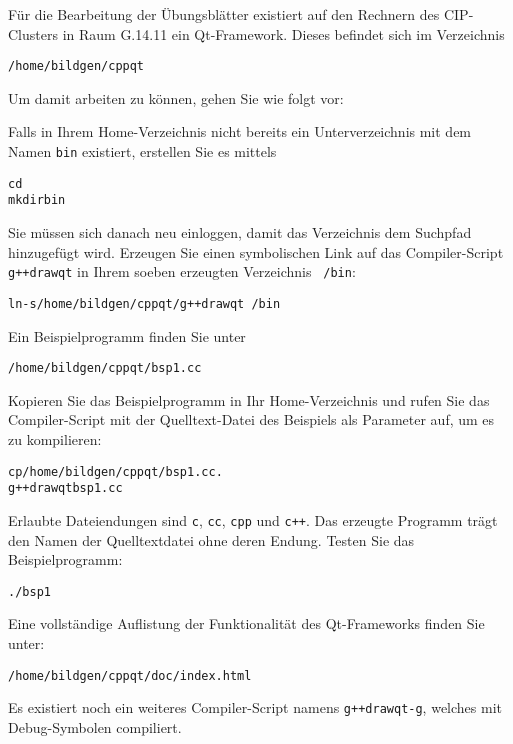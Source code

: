 %
Für die Bearbeitung der Übungsblätter existiert auf den Rechnern des
CIP-Clusters in Raum G.14.11 ein Qt-Framework. Dieses befindet sich im 
Verzeichnis
%
\vspace{-.5em}%
\begin{alltt}
   /home/bildgen/cppqt
\end{alltt}
\vspace{-.5em}%
Um damit arbeiten zu können, gehen Sie wie folgt vor:
%
\begin{bivsubt}
	\bivitem Falls in Ihrem Home-Verzeichnis nicht bereits ein
		Unterverzeichnis mit dem Namen \texttt{bin} existiert, erstellen
		Sie es mittels
		\begin{alltt}
		   cd ~
		   mkdir bin 
		\end{alltt}
		Sie müssen sich danach neu einloggen, damit das Verzeichnis dem
		Suchpfad hinzugefügt wird.
	\bivitem Erzeugen Sie einen symbolischen Link auf das Compiler-Script
		\texttt{g++drawqt} in Ihrem soeben erzeugten Verzeichnis 
		\texttt{\string~/bin}:
		\begin{alltt}
		   ln -s /home/bildgen/cppqt/g++drawqt \string~/bin
		\end{alltt}
	\bivitem Ein Beispielprogramm finden Sie unter
		\begin{alltt}
		   /home/bildgen/cppqt/bsp1.cc
		\end{alltt}
		Kopieren Sie das Beispielprogramm in Ihr Home-Verzeichnis und
		rufen Sie das Compiler-Script mit der Quelltext-Datei des
		Beispiels als Parameter auf, um es zu kompilieren:
		\begin{alltt}
		   cp /home/bildgen/cppqt/bsp1.cc .
		   g++drawqt bsp1.cc 
		\end{alltt}
		Erlaubte Dateiendungen sind \texttt{c}, \texttt{cc}, \texttt{cpp} 
		und \texttt{c++}.
	\bivitem Das erzeugte Programm trägt den Namen der Quelltextdatei 
		ohne deren Endung. Testen Sie das Beispielprogramm:
		\begin{alltt}
		   ./bsp1
		\end{alltt}
\end{bivsubt}
%
Eine vollständige Auf\/listung der Funktionalität des Qt-Frameworks 
finden Sie unter:
%
\vspace{-.5em}%
\begin{alltt}
   /home/bildgen/cppqt/doc/index.html 
\end{alltt}
\vspace{-.5em}%
%
Es existiert noch ein weiteres Compiler-Script namens 
\texttt{g++drawqt-g}, welches mit Debug-Symbolen compiliert.
